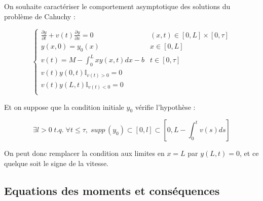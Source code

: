 \documentclass[a4paper]{article}
\newcommand{\dep}{b}
\begin{document}
On souhaite caractériser le comportement asymptotique des solutions du problème de Cahuchy :

\begin{equation}
		\label{eq:poldep}
		\begin{cases}
			\displaystyle \frac{\partial y}{\partial t}+ v(t) \frac{\partial y} {\partial x}  = 0 & (x,t) \in [0,L] \times [0, \tau] \\
             y(x,0) = y_{0} (x) & x\in[0,L]\\
			 v(t) = M - \int_0^L x y(x,t)dx - \dep & t \in [0,\tau]\\
			 v(t)y(0,t)\mathbb{I}_{v(t) > 0} = 0 \\
			 v(t)y(L,t)\mathbb{I}_{v(t) < 0} = 0 \\
		\end{cases}
\end{equation}

Et on suppose que la condition initiale $y_0$ vérifie l'hypothèse :

\begin{equation}
	\label{hyp:compact}
	\exists l>0 \; t.q. \; \forall t \leq \tau, \; supp \, (y_0) \subset [0,l]\subset [0,L-\int_{0}^t v(s)ds]
\end{equation}

On peut donc remplacer la condition aux limites en $x=L$ par $y(L,t)=0$, et ce quelque soit le signe de la vitesse.


\subsection{Equations des moments et conséquences}
\end{document}
